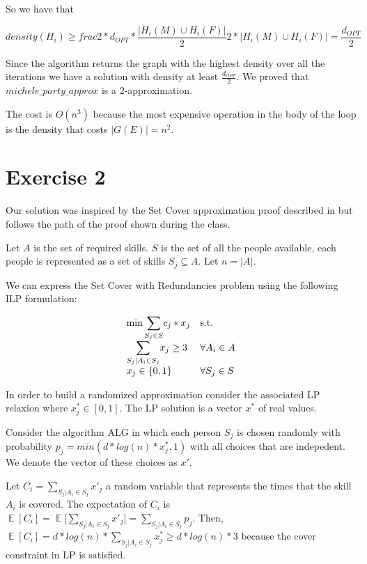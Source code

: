 \documentclass[paper=a4, fontsize=11pt]{scrartcl} %
\numberwithin{equation}{section} %
\numberwithin{figure}{section} %
\numberwithin{table}{section} %
\DeclareMathOperator*{\E}{\mathbb{E}}
\begin{document}
So we have that

\[
density(H_i) \geq frac{2*d_{OPT}*\frac{|H_i(M) \cup H_i(F)|}{2}}{2*|H_i(M) \cup H_i(F)|} = \frac{d_{OPT}}{2}
\]

Since the algorithm returns the graph with the highest density over all the iterations we have a solution with density at least $\frac{d_{OPT}}{2}$.
We proved that $michele\_party\_approx$ is a 2-approximation.

The cost is $O(n^3)$ because the most expensive operation in the body of the loop is the density that costs $|G(E)|=n^2$.

\newpage
\section{Exercise 2}

Our solution was inspired by the Set Cover approximation proof described in \cite{wikiset} but follows the path of the proof shown during the class.

Let $A$ is the set of required skills. $S$ is the set of all the people available, each people is represented as a set of skills $S_j \subseteq A$. Let $n = |A|$.

We can express the Set Cover with Redundancies problem using the following ILP formulation:

\[
    \begin{array}{ll}
    \min \mathlarger{\sum}_{S_j \in S} c_j*x_j & \text{s.t.} \\
    \mathlarger{\sum}_{S_j | A_i \in S_j} x_j \geq 3 & \forall A_i \in A \\
    x_j \in \{0, 1\} & \forall S_j \in S \\
    \end{array}
\]

In order to build a randomized approximation consider the associated LP relaxion where $x^*_j \in [0, 1]$. The LP solution is a vector $x^*$ of real values.

Consider the algorithm ALG in which each person $S_j$ is chosen randomly with probability $p_j = min(d*log(n)*x^*_j, 1)$ with all choices that are indepedent.
We denote the vector of these choices as $x'$.

Let $C_i = \sum_{S_j | A_i \in S_j} x'_j$ a random variable that represents the times that the skill $A_i$ is covered.
The expectation of $C_i$ is $\E[C_i] = \E\Big[\sum_{S_j | A_i \in S_j} x'_j\Big] = \sum_{S_j | A_i \in S_j} p_j$.
Then, $\E[C_i] = d*log(n)*\sum_{S_j | A_i \in S_j} x^*_j \geq d*log(n)*3$ because the cover constraint in LP is satisfied.
\end{document}
